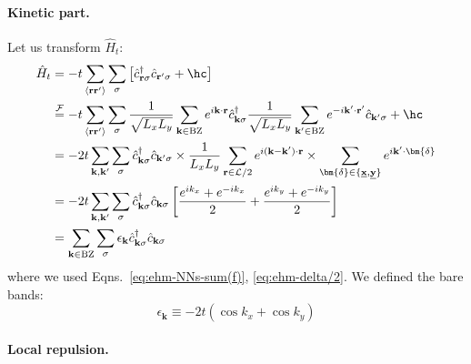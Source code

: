 \paragraph{Kinetic part.}

Let us transform $\hat H_t$:
\begin{align}
	\hat H_t &= -t \sum_{\langle \mathbf{r}\mathbf{r}' \rangle} \sum_\sigma \left[
	\hat c_{\mathbf{r}\sigma}^\dagger \hat c_{\mathbf{r}'\sigma} + \hc
	\right] \nonumber \\
	&\stackrel{\mathcal{F}}{=} -t \sum_{\langle \mathbf{r}\mathbf{r}' \rangle} \sum_\sigma \frac{1}{\sqrt{L_xL_y}} \sum_{\mathbf{k}\in\mathrm{BZ}} e^{i\mathbf{k}\cdot\mathbf{r}} \hat c_{\mathbf{k}\sigma}^\dagger \frac{1}{\sqrt{L_xL_y}} \sum_{\mathbf{k}'\in\mathrm{BZ}} e^{-i\mathbf{k}'\cdot\mathbf{r}'} \hat c_{\mathbf{k}'\sigma} + \hc \nonumber \\
	&= -2t\sum_{\mathbf{k},\mathbf{k}'} \sum_\sigma \hat c_{\mathbf{k}\sigma}^\dagger \hat c_{\mathbf{k}'\sigma} \times \frac{1}{L_x L_y} \sum_{\mathbf{r}\in\mathcal{L}/2} e^{i(\mathbf{k}-\mathbf{k}')\cdot\mathbf{r}} \times \sum_{\bm{\delta} \in \lbrace \underline{\mathbf{x}}, \underline{\mathbf{y}} \rbrace} e^{i \mathbf{k}' \cdot \bm{\delta}} \nonumber \\
	&= -2t\sum_{\mathbf{k},\mathbf{k}'} \sum_\sigma \hat c_{\mathbf{k}\sigma}^\dagger \hat c_{\mathbf{k}\sigma} \left[
		\frac{e^{i k_x}+e^{-i k_x}}{2} + \frac{e^{i k_y}+e^{-i k_y}}{2}
	\right] \\
	&= \sum_{\mathbf{k} \in \mathrm{BZ}} \sum_\sigma \epsilon_\mathbf{k} \hat c_{\mathbf{k}\sigma}^\dagger \hat c_{\mathbf{k}\sigma} \label{eq:Ht-Fourier}
\end{align}
where we used Eqns.~\eqref{eq:ehm-NNs-sum(f)}, \eqref{eq:ehm-delta/2}. We defined the bare bands: 
\begin{equation}\label{eq:bare-bands}
	\epsilon_\mathbf{k} \equiv -2t \left(
	\cos k_x + \cos k_y
	\right)
\end{equation}

\paragraph{Local repulsion.}

